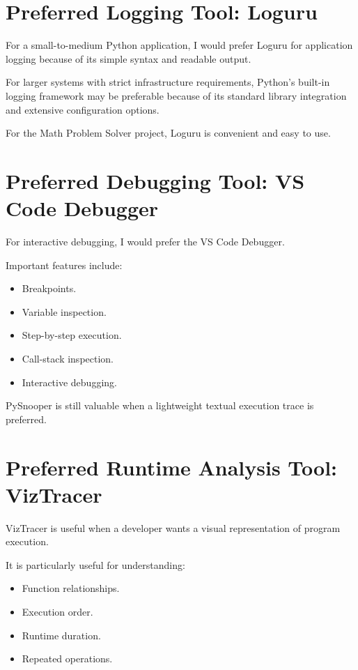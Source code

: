 \documentclass[12pt,a4paper]{report}
\begin{document}
\section{Preferred Logging Tool: Loguru}

For a small-to-medium Python application, I would prefer Loguru for
application logging because of its simple syntax and readable output.

For larger systems with strict infrastructure requirements, Python's
built-in logging framework may be preferable because of its standard
library integration and extensive configuration options.

For the Math Problem Solver project, Loguru is convenient and easy to
use.

\section{Preferred Debugging Tool: VS Code Debugger}

For interactive debugging, I would prefer the VS Code Debugger.

Important features include:

\begin{itemize}
    \item Breakpoints.
    \item Variable inspection.
    \item Step-by-step execution.
    \item Call-stack inspection.
    \item Interactive debugging.
\end{itemize}

PySnooper is still valuable when a lightweight textual execution trace
is preferred.

\section{Preferred Runtime Analysis Tool: VizTracer}

VizTracer is useful when a developer wants a visual representation of
program execution.

It is particularly useful for understanding:

\begin{itemize}
    \item Function relationships.
    \item Execution order.
    \item Runtime duration.
    \item Repeated operations.
\end{itemize}
\end{document}

